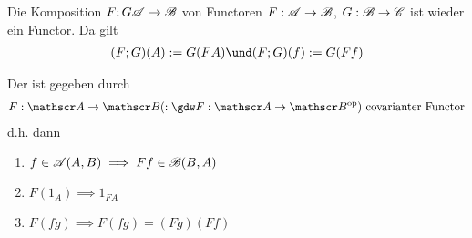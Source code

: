 \begin{bemerkung}
	Die Komposition $F;G \mathscr A \to \mathscr B$ von Functoren $F: \mathscr A \to \mathscr B$, $G: \mathscr B \to \mathscr C$ ist wieder ein Functor. Da gilt
	\begin{align*}
		(F;G)(A) := G(FA) \und (F;G)(f) := G(Ff)
	\end{align*}
\end{bemerkung}
\begin{bemerkung}
	Der  ist gegeben durch
	\begin{align*}
		F: \CatA \to \CatB (:\gdw F: \CatA \to \CatB^{\op}) \text{ covarianter Functor}
	\end{align*}
	d.h. dann
	\begin{enumerate}[start=0]
		\item $f \in \mathscr A(A,B) \implies Ff \in \mathscr B(B,A)$
		\item $F(1_A) \implies 1_{FA}$
		\item $F(fg) \implies F(fg) = (Fg)(Ff)$
	\end{enumerate}
\end{bemerkung}
